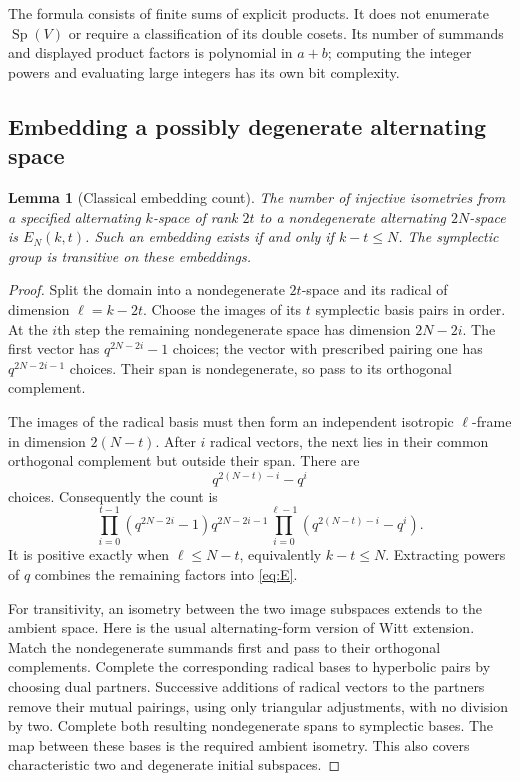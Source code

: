 \documentclass[11pt]{article}
\numberwithin{equation}{section}
\newtheorem{lemma}[theorem]{Lemma}
\theoremstyle{definition}
\theoremstyle{remark}
\newcommand{\Sp}{\operatorname{Sp}}
\begin{document}
The formula consists of finite sums of explicit products. It does not enumerate $\Sp(V)$ or require a classification of its double cosets. Its number of summands and displayed product factors is polynomial in $a+b$; computing the integer powers and evaluating large integers has its own bit complexity.

\subsection{Embedding a possibly degenerate alternating space}
\begin{lemma}[Classical embedding count]\label{lem:embeddings}
The number of injective isometries from a specified alternating $k$-space of rank $2t$ to a nondegenerate alternating $2N$-space is $E_N(k,t)$. Such an embedding exists if and only if $k-t\le N$. The symplectic group is transitive on these embeddings.
\end{lemma}
\begin{proof}
Split the domain into a nondegenerate $2t$-space and its radical of dimension $\ell=k-2t$. Choose the images of its $t$ symplectic basis pairs in order. At the $i$th step the remaining nondegenerate space has dimension $2N-2i$. The first vector has $q^{2N-2i}-1$ choices; the vector with prescribed pairing one has $q^{2N-2i-1}$ choices. Their span is nondegenerate, so pass to its orthogonal complement.

The images of the radical basis must then form an independent isotropic $\ell$-frame in dimension $2(N-t)$. After $i$ radical vectors, the next lies in their common orthogonal complement but outside their span. There are
\[
 q^{2(N-t)-i}-q^i
\]
choices. Consequently the count is
\begin{equation}\label{eq:integerE}
 \prod_{i=0}^{t-1}(q^{2N-2i}-1)q^{2N-2i-1}
 \prod_{i=0}^{\ell-1}(q^{2(N-t)-i}-q^i).
\end{equation}
It is positive exactly when $\ell\le N-t$, equivalently $k-t\le N$. Extracting powers of $q$ combines the remaining factors into \eqref{eq:E}.

For transitivity, an isometry between the two image subspaces extends to the ambient space. Here is the usual alternating-form version of Witt extension. Match the nondegenerate summands first and pass to their orthogonal complements. Complete the corresponding radical bases to hyperbolic pairs by choosing dual partners. Successive additions of radical vectors to the partners remove their mutual pairings, using only triangular adjustments, with no division by two. Complete both resulting nondegenerate spans to symplectic bases. The map between these bases is the required ambient isometry. This also covers characteristic two and degenerate initial subspaces.
\end{proof}
\end{document}
